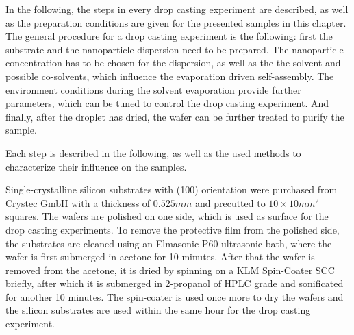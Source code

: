 \documentclass[\main/dresen_thesis.tex]{subfiles}
\begin{document}
  \label{sec:monolayers:nanoparticle:dropcastingExperiments}

  In the following, the steps in every drop casting experiment are described, as well as the preparation conditions are given for the presented samples in this chapter.
  The general procedure for a drop casting experiment is the following:
  first the substrate and the nanoparticle dispersion need to be prepared.
  The nanoparticle concentration has to be chosen for the dispersion, as well as the the solvent and possible co-solvents, which influence the evaporation driven self-assembly.
  The environment conditions during the solvent evaporation provide further parameters, which can be tuned to control the drop casting experiment.
  And finally, after the droplet has dried, the wafer can be further treated to purify the sample.

  Each step is described in the following, as well as the used methods to characterize their influence on the samples.

    Single-crystalline silicon substrates with (100) orientation were purchased from Crystec GmbH with a thickness of $0.525 \unit{mm}$ and precutted to $10 \times 10 \unit{mm^2}$ squares.
    The wafers are polished on one side, which is used as surface for the drop casting experiments.
    To remove the protective film from the polished side, the substrates are cleaned using an Elmasonic P60 ultrasonic bath, where the wafer is first submerged in acetone for 10 minutes.
    After that the wafer is removed from the acetone, it is dried by spinning on a KLM Spin-Coater SCC briefly, after which it is submerged in 2-propanol of HPLC grade and sonificated for another 10 minutes.
    The spin-coater is used once more to dry the wafers and the silicon substrates are used within the same hour for the drop casting experiment.
\end{document}
